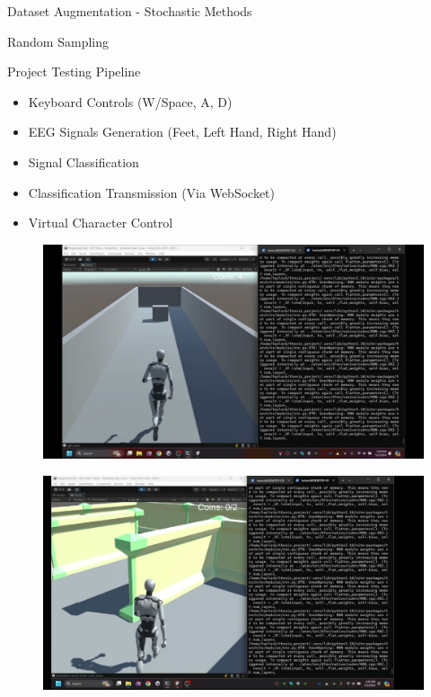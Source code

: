 \begin{frame}{Dataset Augmentation - Stochastic Methods}
\begin{minipage}[c]{.33\textwidth}
            {\tiny Random Sampling}
    \end{minipage}
\end{frame}

\begin{frame}{Project Testing Pipeline}
    \begin{minipage}[c]{.65\textwidth}
        \begin{itemize}
            \item Keyboard Controls (W/Space, A, D)
            \item EEG Signals Generation (Feet, Left Hand, Right Hand)
            \item Signal Classification
            \item Classification Transmission (Via WebSocket)
            \item Virtual Character Control
        \end{itemize}
    \end{minipage}
    \begin{minipage}[c]{.33\textwidth}
        \begin{figure}[htpb!]
            \centering
            \href{https://youtu.be/13iwuG1pyk0}{%
            \includegraphics[width=\textwidth]{figures/gameplay/infinite_runner}%
            }
        \end{figure}
        \begin{figure}[htpb!]
            \centering
            \href{https://youtu.be/aBgP87yz1Lw}{%
            \includegraphics[width=\textwidth]{figures/gameplay/maze}%
            }
        \end{figure}
    \end{minipage}
\end{frame}